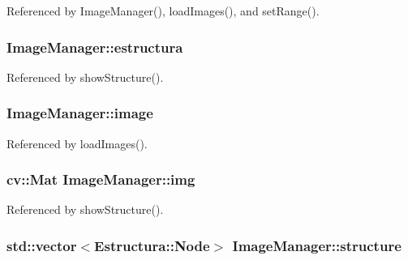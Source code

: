 Referenced by Image\+Manager(), load\+Images(), and set\+Range().

\subsubsection[{\texorpdfstring{estructura}{estructura}}]{ Image\+Manager\+::estructura\hspace{0.3cm}{\ttfamily [private]}}\hypertarget{classImageManager_a9d328384bb5a1e13d0a50aefea3680cf}{}\label{classImageManager_a9d328384bb5a1e13d0a50aefea3680cf}


Referenced by show\+Structure().

\subsubsection[{\texorpdfstring{image}{image}}]{ Image\+Manager\+::image\hspace{0.3cm}{\ttfamily [private]}}\hypertarget{classImageManager_a8a66a77f0bb0dc06c2d3d064f9f1e27f}{}\label{classImageManager_a8a66a77f0bb0dc06c2d3d064f9f1e27f}


Referenced by load\+Images().

\subsubsection[{\texorpdfstring{img}{img}}]{\setlength{\rightskip}{0pt plus 5cm}cv\+::\+Mat Image\+Manager\+::img\hspace{0.3cm}{\ttfamily [private]}}\hypertarget{classImageManager_ae096d2db43b8d7efe508ff68b987e992}{}\label{classImageManager_ae096d2db43b8d7efe508ff68b987e992}


Referenced by show\+Structure().

\subsubsection[{\texorpdfstring{structure}{structure}}]{\setlength{\rightskip}{0pt plus 5cm}std\+::vector$<${\bf Estructura\+::\+Node}$>$ Image\+Manager\+::structure\hspace{0.3cm}{\ttfamily [private]}}\hypertarget{classImageManager_a9a2da56c0a4aa3d4cdebdea45d81cca7}{}\label{classImageManager_a9a2da56c0a4aa3d4cdebdea45d81cca7}


